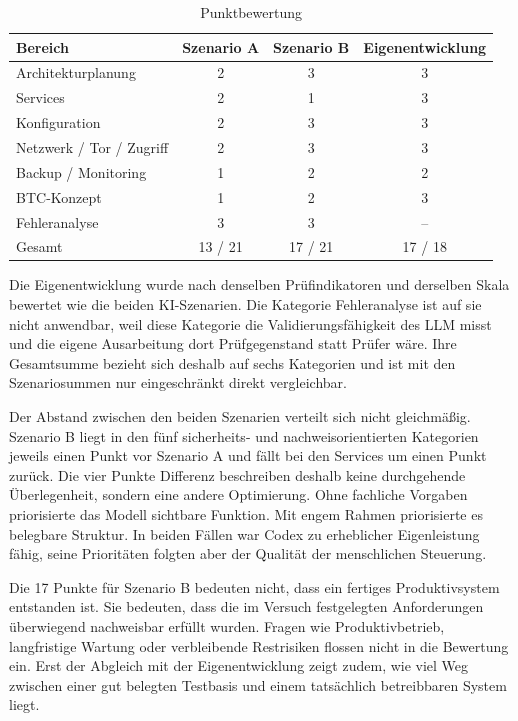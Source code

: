 \begin{table}[h]
\centering
\begin{tabular}{lccc}
\hline
Bereich & Szenario A & Szenario B & Eigenentwicklung \\
\hline
Architekturplanung & 2 & 3 & 3 \\
Services & 2 & 1 & 3 \\
Konfiguration & 2 & 3 & 3 \\
Netzwerk / Tor / Zugriff & 2 & 3 & 3 \\
Backup / Monitoring & 1 & 2 & 2 \\
\ac{BTC}-Konzept & 1 & 2 & 3 \\
Fehleranalyse & 3 & 3 & -- \\
\hline
Gesamt & 13 / 21 & 17 / 21 & 17 / 18 \\
\hline
\end{tabular}
\caption{Punktbewertung}
\label{tab:ki-evaluation-szenarien}
\end{table}


Die Eigenentwicklung wurde nach denselben Prüfindikatoren und derselben Skala bewertet wie die beiden \ac{KI}-Szenarien. Die Kategorie Fehleranalyse ist auf sie nicht anwendbar, weil diese Kategorie die Validierungsfähigkeit des \ac{LLM} misst und die eigene Ausarbeitung dort Prüfgegenstand statt Prüfer wäre. Ihre Gesamtsumme bezieht sich deshalb auf sechs Kategorien und ist mit den Szenariosummen nur eingeschränkt direkt vergleichbar.

Der Abstand zwischen den beiden Szenarien verteilt sich nicht gleichmäßig.
Szenario B liegt in den fünf sicherheits- und nachweisorientierten Kategorien jeweils einen Punkt vor Szenario A und fällt bei den Services um einen Punkt zurück. 
Die vier Punkte Differenz beschreiben deshalb keine durchgehende Überlegenheit, sondern eine andere Optimierung. 
Ohne fachliche Vorgaben priorisierte das Modell sichtbare Funktion. Mit engem Rahmen priorisierte es belegbare Struktur. 
In beiden Fällen war Codex zu erheblicher Eigenleistung
fähig, seine Prioritäten folgten aber der Qualität der menschlichen Steuerung.

Die 17 Punkte für Szenario B bedeuten nicht, dass ein fertiges Produktivsystem entstanden ist. Sie bedeuten, dass die im Versuch festgelegten Anforderungen überwiegend nachweisbar erfüllt wurden. 
Fragen wie Produktivbetrieb, langfristige Wartung oder verbleibende Restrisiken flossen nicht in die Bewertung ein. 
Erst der Abgleich mit der Eigenentwicklung zeigt zudem, wie viel Weg zwischen einer gut belegten Testbasis und einem tatsächlich betreibbaren System liegt.

